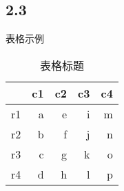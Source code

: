 \subsection{2.3}
\begin{frame}{表格示例}
\begin{table}[htbp]
  \centering
  \caption{表格标题}
    \begin{tabular}{rrrrr}
    \addlinespace
    \toprule
          & c1    & c2    & c3    & c4 \\
    \midrule
    r1    & a     & e     & i     & m \\
    r2    & b     & f     & j     & n \\
    r3    & c     & g     & k     & o \\
    r4    & d     & h     & l     & p \\
    \bottomrule
    \end{tabular}%
  \label{tab:addlabel}%
\end{table}%
\end{frame}






